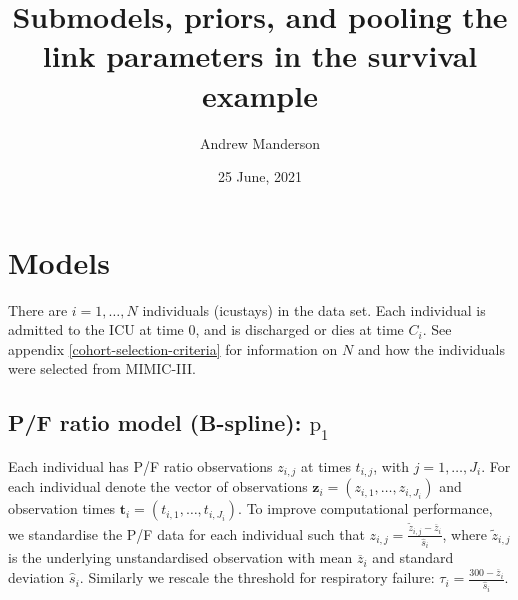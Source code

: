 \documentclass[
  10pt,
  a4paper,
]{article}
\title{Submodels, priors, and pooling the link parameters in the
survival example}
\author{Andrew Manderson}
\date{25 June, 2021}
\newcommand{\pd}{\text{p}}
\begin{document}
\maketitle

\hypertarget{models}{%
\section{Models}\label{models}}

There are \(i = 1, \ldots, N\) individuals (icustays) in the data set.
Each individual is admitted to the ICU at time \(0\), and is discharged
or dies at time \(C_{i}\). See appendix \ref{cohort-selection-criteria}
for information on \(N\) and how the individuals were selected from
MIMIC-III.

\hypertarget{pf-ratio-model-b-spline-pd_1}{%
\subsection{\texorpdfstring{P/F ratio model (B-spline):
\(\pd_{1}\)}{P/F ratio model (B-spline): \textbackslash pd\_\{1\}}}\label{pf-ratio-model-b-spline-pd_1}}

Each individual has P/F ratio observations \(z_{i, j}\) at times
\(t_{i, j}\), with \(j = 1, \ldots, J_{i}\). For each individual denote
the vector of observations
\(\boldsymbol{z}_{i} = (z_{i, 1}, \ldots, z_{i, J_{i}})\) and
observation times
\(\boldsymbol{t}_{i} = (t_{i, 1}, \ldots, t_{i, J_{i}})\). To improve
computational performance, we standardise the P/F data for each
individual such that
\(z_{i, j} = \frac{\tilde{z}_{i, j} - \overline{z}_{i}}{\hat{s}_{i}}\),
where \(\tilde{z}_{i, j}\) is the underlying unstandardised observation
with mean \(\overline{z}_{i}\) and standard deviation \(\hat{s}_{i}\).
Similarly we rescale the threshold for respiratory failure:
\(\tau_{i} = \frac{300 - \overline{z}_{i}}{\hat{s}_{i}}\).
\end{document}
